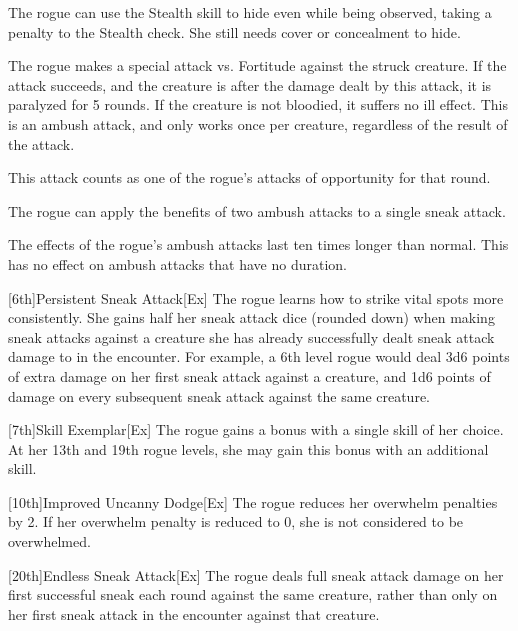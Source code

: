 The rogue can use the Stealth skill to hide even while being observed, taking a  penalty to the Stealth check.
She still needs cover or concealment to hide.

The rogue makes a special attack vs. Fortitude against the struck creature.
If the attack succeeds, and the creature is \bloodied after the damage dealt by this attack, it is paralyzed for 5 rounds.
If the creature is not bloodied, it suffers no ill effect.
This is an ambush attack, and only works once per creature, regardless of the result of the attack.

This attack counts as one of the rogue's attacks of opportunity for that round.

The rogue can apply the benefits of two ambush attacks to a single sneak attack.

The effects of the rogue's ambush attacks last ten times longer than normal.
This has no effect on ambush attacks that have no duration.

[6th]{Persistent Sneak Attack}[Ex]
The rogue learns how to strike vital spots more consistently.
She gains half her sneak attack dice (rounded down) when making sneak attacks against a creature she has already successfully dealt sneak attack damage to in the encounter.
For example, a 6th level rogue would deal 3d6 points of extra damage on her first sneak attack against a creature, and 1d6 points of damage on every subsequent sneak attack against the same creature.

[7th]{Skill Exemplar}[Ex]
The rogue gains a  bonus with a single skill of her choice.
At her 13th and 19th rogue levels, she may gain this bonus with an additional skill.

[10th]{Improved Uncanny Dodge}[Ex]
The rogue reduces her overwhelm penalties by 2.
If her overwhelm penalty is reduced to 0, she is not considered to be overwhelmed.

[20th]{Endless Sneak Attack}[Ex]
The rogue deals full sneak attack damage on her first successful sneak each round against the same creature, rather than only on her first sneak attack in the encounter against that creature.

